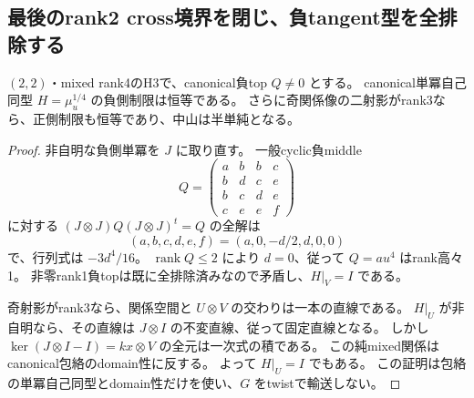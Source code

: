 \subsection{最後のrank2 cross境界を閉じ、負tangent型を全排除する}
\begin{lemma}[非零負topの単冪rigidity]
\label{lem:h3-order2-22-nonzero-negative-unipotent}
$(2,2)$・mixed rank4のH3で、canonical負top $Q\ne0$ とする。
canonical単冪自己同型 $H=\mu_u^{1/4}$ の負側制限は恒等である。
さらに奇関係像の二射影がrank3なら、正側制限も恒等であり、中山は半単純となる。
\end{lemma}
\begin{proof}
非自明な負側単冪を $J$ に取り直す。
一般cyclic負middle
\[
 Q=\begin{pmatrix}a&b&b&c\\b&d&c&e\\b&c&d&e\\c&e&e&f\end{pmatrix}
\]
に対する $(J\otimes J)Q(J\otimes J)^t=Q$ の全解は
\[
 (a,b,c,d,e,f)=(a,0,-d/2,d,0,0)
\]
で、行列式は $-3d^4/16$。
$\operatorname{rank}Q\le2$ により $d=0$、従って $Q=au^4$ はrank高々1。
非零rank1負topは既に全排除済みなので矛盾し、$H|_V=I$ である。

奇射影がrank3なら、関係空間と $U\otimes V$ の交わりは一本の直線である。
$H|_U$ が非自明なら、その直線は $J\otimes I$ の不変直線、従って固定直線となる。
しかし $\ker(J\otimes I-I)=kx\otimes V$ の全元は一次式の積である。
この純mixed関係はcanonical包絡のdomain性に反する。
よって $H|_U=I$ でもある。
この証明は包絡の単冪自己同型とdomain性だけを使い、$G$ をtwistで輸送しない。
\end{proof}

